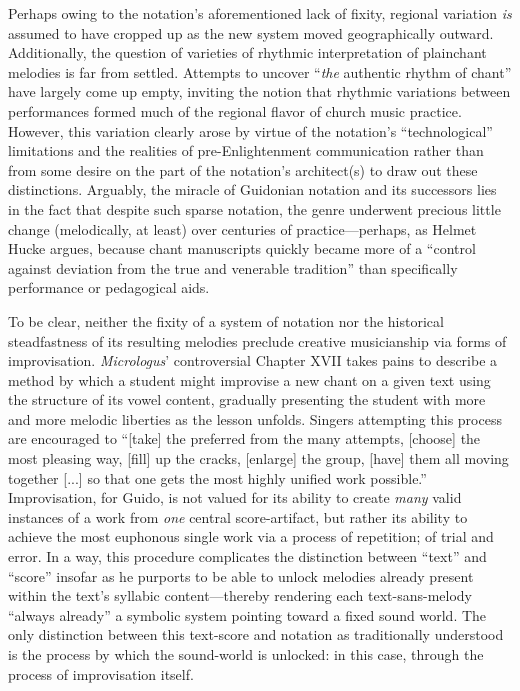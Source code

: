     Perhaps owing to the notation's aforementioned lack of fixity, regional variation \textit{is} assumed to have cropped up as the new system moved geographically outward.\autocite[466]{Hucke_1980} Additionally, the question of varieties of rhythmic interpretation of plainchant melodies is far from settled. Attempts to uncover ``\textit{the} authentic rhythm of chant''\autocite[319]{Brunner_1982} have largely come up empty, inviting the notion that rhythmic variations between performances formed much of the regional flavor of church music practice. However, this variation clearly arose by virtue of the notation's ``technological'' limitations and the realities of pre-Enlightenment communication rather than from some desire on the part of the notation's architect(s) to draw out these distinctions. Arguably, the miracle of Guidonian notation and its successors lies in the fact that despite such sparse notation, the genre underwent precious little change (melodically, at least) over centuries of practice---perhaps, as Helmet Hucke argues, because chant manuscripts quickly became more of a ``control against deviation from the true and venerable tradition'' than specifically performance or pedagogical aids.\autocite[448]{Hucke_1980}

    To be clear, neither the fixity of a system of notation nor the historical steadfastness of its resulting melodies preclude creative musicianship via forms of improvisation. \textit{Micrologus}' controversial Chapter XVII takes pains to describe a method by which a student might improvise a new chant on a given text using the structure of its vowel content, gradually presenting the student with more and more melodic liberties as the lesson unfolds. Singers attempting this process are encouraged to ``[take] the preferred from the many attempts, [choose] the most pleasing way, [fill] up the cracks, [enlarge] the group, [have] them all moving together [...] so that one gets the most highly unified work possible.''\autocite[70]{Arezzo_1943} Improvisation, for Guido, is not valued for its ability to create \textit{many} valid instances of a work from \textit{one} central score-artifact, but rather its ability to achieve the most euphonous single work via a process of repetition; of trial and error. In a way, this procedure complicates the distinction between ``text'' and ``score'' insofar as he  purports to be able to unlock melodies already present within the text's syllabic content---thereby rendering each text-sans-melody ``always already'' a symbolic system pointing toward a fixed sound world. The only distinction between this text-score and notation as traditionally understood is the process by which the sound-world is unlocked: in this case, through the process of improvisation itself.

